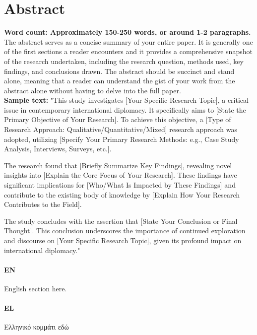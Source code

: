 \setlength{\parskip}{0pt}

\clearpage
\chapter*{Abstract}

\textbf{Word count: Approximately 150-250 words, or around 1-2 paragraphs.}\\

The abstract serves as a concise summary of your entire paper. It is generally one of the first sections a reader encounters and it provides a comprehensive snapshot of the research undertaken, including the research question, methods used, key findings, and conclusions drawn. The abstract should be succinct and stand alone, meaning that a reader can understand the gist of your work from the abstract alone without having to delve into the full paper.\\

\textbf{Sample text:}
"This study investigates [Your Specific Research Topic], a critical issue in contemporary international diplomacy. It specifically aims to [State the Primary Objective of Your Research]. To achieve this objective, a [Type of Research Approach: Qualitative/Quantitative/Mixed] research approach was adopted, utilizing [Specify Your Primary Research Methods: e.g., Case Study Analysis, Interviews, Surveys, etc.].

The research found that [Briefly Summarize Key Findings], revealing novel insights into [Explain the Core Focus of Your Research]. These findings have significant implications for [Who/What Is Impacted by These Findings] and contribute to the existing body of knowledge by [Explain How Your Research Contributes to the Field].

The study concludes with the assertion that [State Your Conclusion or Final Thought]. This conclusion underscores the importance of continued exploration and discourse on [Your Specific Research Topic], given its profound impact on international diplomacy."

\subsubsection{EN}
English section here.

\subsubsection{EL}
Ελληνικό κομμάτι εδώ
